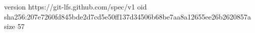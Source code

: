version https://git-lfs.github.com/spec/v1
oid sha256:207e7260fd845bde2d7cd5e50ff137d34506b68be7aa8a12655ee26b2620857a
size 57
